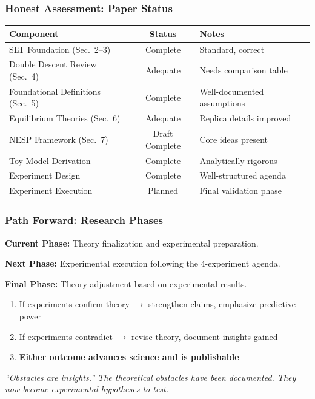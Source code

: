 \documentclass[
  journal=largetwo,
  year=2025,
  volume=37,
]{cup-journal}
\begin{document}
\subsubsection*{Honest Assessment: Paper Status}

\begin{center}
\begin{tabular}{|l|c|l|}
\hline
\textbf{Component} & \textbf{Status} & \textbf{Notes} \\
\hline
SLT Foundation (Sec.~2--3) & \textcolor{green!60!black}{Complete} & Standard, correct \\
Double Descent Review (Sec.~4) & \textcolor{orange!80!black}{Adequate} & Needs comparison table \\
Foundational Definitions (Sec.~5) & \textcolor{green!60!black}{Complete} & Well-documented assumptions \\
Equilibrium Theories (Sec.~6) & \textcolor{orange!80!black}{Adequate} & Replica details improved \\
NESP Framework (Sec.~7) & \textcolor{green!60!black}{Draft Complete} & Core ideas present \\
Toy Model Derivation & \textcolor{green!60!black}{Complete} & Analytically rigorous \\
Experiment Design & \textcolor{green!60!black}{Complete} & Well-structured agenda \\
Experiment Execution & \textcolor{blue!70}{Planned} & Final validation phase \\
\hline
\end{tabular}
\end{center}

\subsubsection*{Path Forward: Research Phases}

\textbf{Current Phase:} Theory finalization and experimental preparation.

\textbf{Next Phase:} Experimental execution following the 4-experiment agenda.

\textbf{Final Phase:} Theory adjustment based on experimental results.

\begin{enumerate}
    \item[$\square$] If experiments confirm theory $\to$ strengthen claims, emphasize predictive power
    \item[$\square$] If experiments contradict $\to$ revise theory, document insights gained
    \item[$\square$] \textbf{Either outcome advances science and is publishable}
\end{enumerate}

\textit{``Obstacles are insights.'' The theoretical obstacles have been documented. They now become experimental hypotheses to test.}


\clearpage

\nocite{*}
\printbibliography
\end{document}
